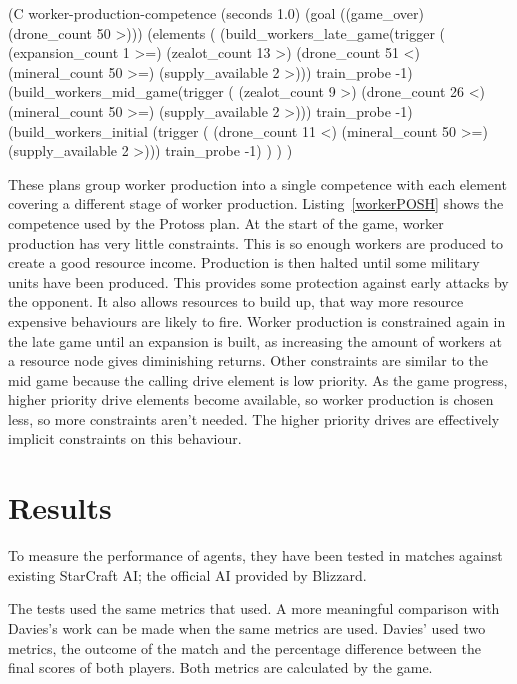 \documentclass[11pt,openright,a4paper]{report}
\begin{document}
\begin{Code}[frame=single,language=Lisp,tabsize=4,breaklines,breakatwhitespace,caption={A competence to control the production of worker units at different stages of the game.},label=workerPOSH]
(C worker-production-competence (seconds 1.0) (goal ((game_over) (drone_count 50 >)))
	(elements
		(
			(build_workers_late_game(trigger (
										(expansion_count 1 >=)
                                        (zealot_count 13 >)
										(drone_count 51 <)
										(mineral_count 50 >=)
										(supply_available 2 >)))
				train_probe -1)
			(build_workers_mid_game(trigger (
										(zealot_count 9 >)
										(drone_count 26 <)
										(mineral_count 50 >=)
										(supply_available 2 >)))
				train_probe -1)
			(build_workers_initial (trigger (
										(drone_count 11 <)
										(mineral_count 50 >=)
										(supply_available 2 >)))
				train_probe -1)
		)
	)
)
\end{Code}

These plans group worker production into a single competence with each element covering a different stage of worker production. Listing~\ref{workerPOSH} shows the competence used by the Protoss plan. At the start of the game, worker production has very little constraints. This is so enough workers are produced to create a good resource income. Production is then halted until some military units have been produced. This provides some protection against early attacks by the opponent. It also allows resources to build up, that way more resource expensive behaviours are likely to fire. Worker production is constrained again in the late game until an expansion is built, as increasing the amount of workers at a resource node gives diminishing returns. Other constraints are similar to the mid game because the calling drive element is low priority. As the game progress, higher priority drive elements become available, so worker production is chosen less, so more constraints aren't needed. The higher priority drives are effectively implicit constraints on this behaviour.



\chapter{Results}
To measure the performance of agents, they have been tested in matches against existing StarCraft AI; the official AI provided by Blizzard.

The tests used the same metrics that  used. A more meaningful comparison with Davies's work can be made when the same metrics are used. Davies' used two metrics, the outcome of the match and the percentage difference between the final scores of both players. Both metrics are calculated by the game.
\end{document}
